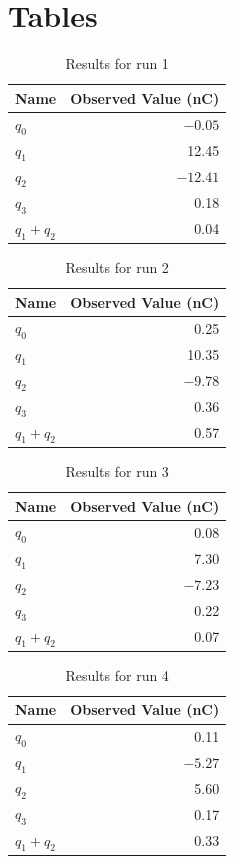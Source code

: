 \section{Tables}
%
\begin{table}[ht]
	\centering
	\begin{tabular}{|l|r|}
		\hline
		Name & Observed Value (nC) \\
		\hline
		$q_{0}$ & $-0.05$ \\
		$q_{1}$ & 12.45 \\
		$q_{2}$ & $-12.41$ \\
		$q_{3}$ & 0.18 \\
		$q_{1} + q_{2}$ & 0.04 \\
		\hline
	\end{tabular}
	\caption{Results for run 1}
	\label{table_01_run_1}
\end{table}
%
\begin{table}[ht]
	\centering
	\begin{tabular}{|l|r|}
		\hline
		Name & Observed Value (nC) \\
		\hline
		$q_{0}$ & 0.25 \\
		$q_{1}$ & 10.35 \\
		$q_{2}$ & $-9.78$ \\
		$q_{3}$ & 0.36 \\
		$q_{1} + q_{2}$ & 0.57 \\
		\hline
	\end{tabular}
	\caption{Results for run 2}
	\label{table_01_run_2}
\end{table}
%
\begin{table}[ht]
	\centering
	\begin{tabular}{|l|r|}
		\hline
		Name & Observed Value (nC) \\
		\hline
		$q_{0}$ & 0.08 \\
		$q_{1}$ & 7.30 \\
		$q_{2}$ & $-7.23$ \\
		$q_{3}$ & 0.22 \\
		$q_{1} + q_{2}$ & 0.07 \\
		\hline
	\end{tabular}
	\caption{Results for run 3}
	\label{table_01_run_3}
\end{table}
%
\begin{table}[ht]
	\centering
	\begin{tabular}{|l|r|}
		\hline
		Name & Observed Value (nC) \\
		\hline
		$q_{0}$ & 0.11 \\
		$q_{1}$ & $-5.27$ \\
		$q_{2}$ & 5.60 \\
		$q_{3}$ & 0.17 \\
		$q_{1} + q_{2}$ & 0.33 \\
		\hline
	\end{tabular}
	\caption{Results for run 4}
	\label{table_01_run_4}
\end{table}
